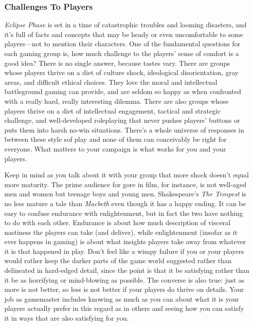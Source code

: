\subsubsection{Challenges To Players }

\textit{Eclipse Phase} is set in a time of catastrophic troubles 
and looming disasters, and it's full of facts and concepts
that may be heady or even uncomfortable to
some players—not to mention their characters. One of 
the fundamental questions for each gaming group is, 
how much challenge to the players' sense of comfort is 
a good idea? There is no single answer, because tastes 
vary. There are groups whose players thrive on a diet 
of culture shock, ideological disorientation, gray areas, 
and difficult ethical choices. They love the moral and 
intellectual battleground gaming can provide, and 
are seldom so happy as when confronted with a 
really hard, really interesting dilemma. There are also 
groups whose players thrive on a diet of intellectual 
engagement, tactical and strategic challenge, and well-developed
roleplaying that never pushes players'
buttons or puts them into harsh no-win situations. 
There's a whole universe of responses in between these 
style sof play and none of them can conceivably be 
right for everyone. What matters to your campaign is 
what works for you and your players. 

Keep in mind as you talk about it with your group 
that more shock doesn't equal more maturity. The 
prime audience for gore in film, for instance, is not 
well-aged men and women but teenage boys and 
young men. Shakespeare's \textit{The Tempest }is no less 
mature a tale than \textit{Macbeth  }even though it has a 
happy ending. It can be easy to confuse endurance 
with enlightenment, but in fact the two have nothing 
to do with each other. Endurance is about how much 
description of visceral nastiness the players can take 
(and deliver), while enlightenment (insofar as it ever 
happens in gaming) is about what insights players 
take away from whatever it is that happened in play. 
Don't feel like a wimpy failure if you or your players 
would rather keep the darker parts of the game world 
suggested rather than delineated in hard-edged detail, 
since the point is that it be satisfying rather than it 
be as horrifying or mind-blowing as possible. The 
converse is also true: just as more is not better, so less 
is not better if your players do thrive on details. Your 
job as gamemaster includes knowing as much as you 
can about what it is your players actually prefer in 
this regard as in others and seeing how you can satisfy 
it in ways that are also satisfying for you. 

